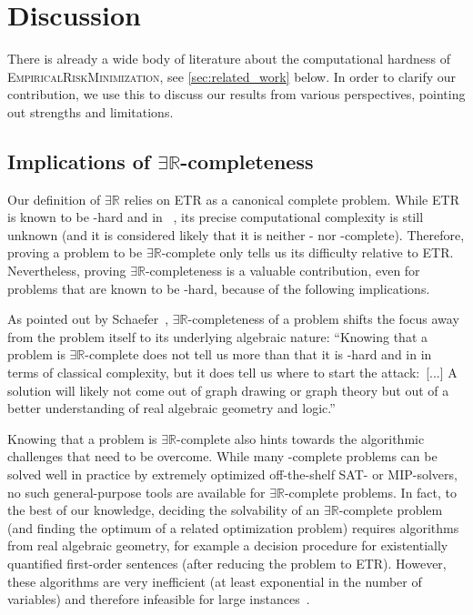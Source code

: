 \documentclass[11pt]{article}
\numberwithin{equation}{section}
\theoremstyle{definition}
\theoremstyle{plain}
\newcommand{\R}{\mathbb R}
\newcommand{\ER}{\texorpdfstring{\ensuremath{\exists\R}}{ER}\xspace}
\newcommand{\problemname}[1]{\textnormal{\textsc{#1}}\xspace}
\newcommand{\ETR}{\problemname{ETR}}
\newcommand{\ERM}{\problemname{EmpiricalRiskMinimization}}
\renewcommand{\SAT}{\problemname{SAT}}
\renewcommand{\MIP}{\problemname{MIP}}
\theoremstyle{plain}
\begin{document}
\section{Discussion}
\label{sec:discussion}

There is already a wide body of literature about the computational hardness of \ERM, see \cref{sec:related_work} below.
In order to clarify our contribution, we use this  to discuss our results from various perspectives, pointing out strengths and limitations.

\subsection{Implications of \ER-completeness}
Our definition of \ER relies on \ETR as a canonical complete problem.
While \ETR is known to be \NP-hard and in \PSPACE~\cite{Canny1988_PSPACE, Shor1991_Stretchability}, its precise computational complexity is still unknown (and it is considered likely that it is neither \NP- nor \PSPACE-complete).
Therefore, proving a problem to be \ER-complete only tells us its difficulty relative to \ETR.
Nevertheless, proving \ER-completeness is a valuable contribution, even for problems that are known to be \NP-hard, because of the following implications.

As pointed out by Schaefer~\cite{Schaefer2010_GeometryTopology}, \ER-completeness of a problem shifts the focus away from the problem itself to its underlying algebraic nature:
\enquote{Knowing that a problem is \ER-complete does not tell us more than that it is \NP-hard and in \PSPACE{} in terms of classical complexity, but it does tell us where to start the attack:~[...]
A solution will likely not come out of graph drawing or graph theory but out of a better understanding of real algebraic geometry and logic.}~\cite{Schaefer2010_GeometryTopology}

Knowing that a problem is \ER-complete also hints towards the algorithmic challenges that need to be overcome.
While many \NP-complete problems can be solved well in practice by extremely optimized
off-the-shelf \SAT- or \MIP-solvers, no such 
%
general-purpose  %
tools are available for \ER-complete problems.
In fact, to the best of our knowledge,
%
%
deciding the solvability of an \ER-complete problem (and finding the optimum
of a related optimization problem)  %
requires algorithms from real algebraic geometry, for example a decision procedure for
existentially quantified first-order sentences (after reducing the problem to \ETR).
However, these algorithms are very inefficient (at least exponential in the number of
variables) and therefore infeasible for large instances~\cite{Passmore2009_Experiments}.
\end{document}
